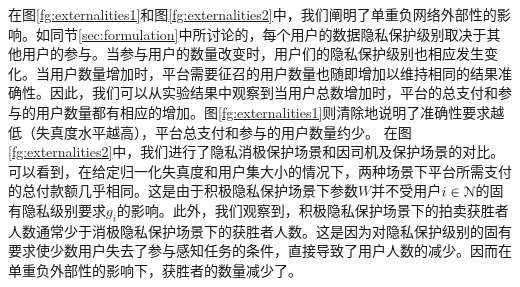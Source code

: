 	
	在图\ref{fg:externalities1}和图\ref{fg:externalities2}中，我们阐明了单重负网络外部性的影响。如同节\ref{sec:formulation}中所讨论的，每个用户的数据隐私保护级别取决于其他用户的参与。当参与用户的数量改变时，用户们的隐私保护级别也相应发生变化。当用户数量增加时，平台需要征召的用户数量也随即增加以维持相同的结果准确性。因此，我们可以从实验结果中观察到当用户总数增加时，平台的总支付和参与的用户数量都有相应的增加。图\ref{fg:externalities1}则清除地说明了准确性要求越低（失真度水平越高），平台总支付和参与的用户数量约少。
	在图\ref{fg:externalities2}中，我们进行了隐私消极保护场景和因司机及保护场景的对比。可以看到，在给定归一化失真度和用户集大小的情况下，两种场景下平台所需支付的总付款额几乎相同。这是由于积极隐私保护场景下参数$W$并不受用户$i\in\mathcal{N}$的固有隐私级别要求$g_i$的影响。此外，我们观察到，积极隐私保护场景下的拍卖获胜者人数通常少于消极隐私保护场景下的获胜者人数。这是因为对隐私保护级别的固有要求使少数用户失去了参与感知任务的条件，直接导致了用户人数的减少。因而在单重负外部性的影响下，获胜者的数量减少了。

